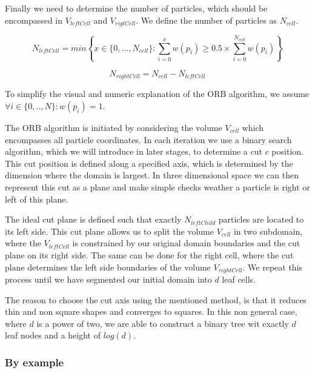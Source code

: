 \documentclass[]{article}
\begin{document}
Finally we need to determine the number of particles, which should be encompassed in $V_{leftCell}$ and $V_{rigtCell}$. We define the number of particles as $N_{cell}$.

\begin{center}
	\begin{equation}
		N_{leftCell} = min \left \{ x \in \{0,...,N_{cell} \} : \sum_{i=0}^{x} w(p_i) \geq 0.5 \times \sum_{i=0}^{N_{cell}} w(p_i) \right \} 
	\end{equation}
\end{center}

\begin{center}
	\begin{equation}
		N_{rightCell} = N_{cell} - N_{leftCell}
	\end{equation}
\end{center}


To simplify the visual and numeric explanation of the ORB algorithm, we assume $\forall i \in \{0,..,N\} : w(p_i) = 1$.

The ORB algorithm is initiated by considering the volume $V_{cell}$ which encompasses all particle coordinates. In each iteration we use a binary search algorithm, which we will introduce in later stages, to determine a cut $c$ position. This cut position is defined along a specified axis, which is determined by the dimension where the domain is largest. In three dimensional space we can then represent this cut as a plane and make simple checks weather a particle is right or left of this plane. 

The ideal cut plane is defined such that exactly $N_{leftChild}$ particles are located to its left side. This cut plane allows us to split the volume $V_{cell}$ in two subdomain, where the $V_{leftCell}$ is constrained by our original domain boundaries and the cut plane on its right side. The same can be done for the right cell, where the cut plane determines the left side boundaries of the volume $V_{rightCell}$. We repeat this process until we have segmented our initial domain into $d$ leaf cells.

The reason to choose the cut axis using the mentioned method, is that it reduces thin and non square shapes and converges to squares. 
In this non general case, where $d$ is a power of two, we are able to construct a binary tree wit exactly $d$ leaf nodes and a height of $log(d)$.

\subsubsection{By example}
\end{document}
